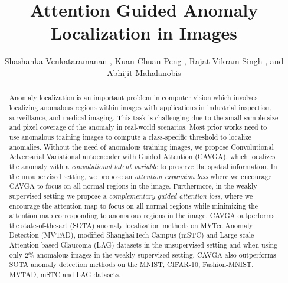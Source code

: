 \documentclass[runningheads]{llncs}
\begin{document}
\pagestyle{headings}
\mainmatter
\def\ECCVSubNumber{2813}

\title{Attention Guided Anomaly Localization in Images}


\author{Shashanka Venkataramanan , Kuan-Chuan Peng , Rajat Vikram Singh , and Abhijit Mahalanobis }

\maketitle
\begin{abstract}
Anomaly localization is an important problem in computer vision which involves localizing anomalous regions within images with applications in industrial inspection, surveillance, and medical imaging. This task is challenging due to the small sample size and pixel coverage of the anomaly in real-world scenarios. Most prior works need to use anomalous training images to compute a class-specific threshold to localize anomalies. Without the need of anomalous training images, we propose Convolutional Adversarial Variational autoencoder with Guided Attention (CAVGA), which localizes the anomaly with a \textit{convolutional latent variable} to preserve the spatial information. In the unsupervised setting, we propose an \textit{attention expansion loss} where we encourage CAVGA to focus on all normal regions in the image.  Furthermore, in the weakly-supervised setting we propose a \textit{complementary guided attention loss}, where we encourage the attention map to focus on all normal regions while minimizing the attention map corresponding to anomalous regions in the image.  CAVGA outperforms the state-of-the-art (SOTA) anomaly localization methods on MVTec Anomaly Detection (MVTAD), modified ShanghaiTech Campus (mSTC) and Large-scale Attention based Glaucoma (LAG) datasets in the unsupervised setting and when using only 2\% anomalous images in the weakly-supervised setting. CAVGA also outperforms SOTA anomaly detection methods on the MNIST, CIFAR-10, Fashion-MNIST, MVTAD, mSTC and LAG datasets. 
\end{abstract}
\end{document}
